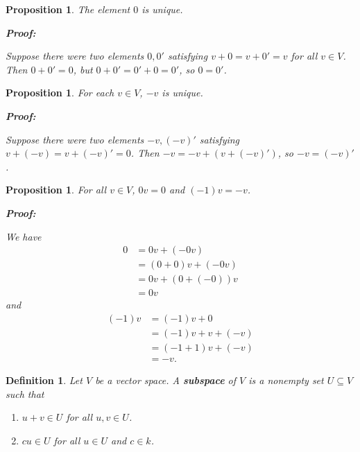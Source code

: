 \documentclass{article}
\theoremstyle{colontheorem}
\newtheorem{proposition}[theorem]{Proposition}
\newtheorem{definition}[theorem]{Definition}
\newenvironment{Proposition}
{
	\begin{mdframed}[backgroundcolor=TheoremOrange!10]
	\begin{proposition}
}
{
	\end{proposition}
	\end{mdframed}
	
	\vspace{.15in}
}
\newenvironment{Def}
{
	\begin{mdframed}[backgroundcolor=DefGreen!10]
	\begin{definition}
}
{
	\end{definition}
	\end{mdframed}
	
	\vspace{.15in}
}
\newenvironment{Proof}
{
	\begin{mdframed}[backgroundcolor=ProofPurple!10]
	\textbf{Proof:}%
}
{
	\end{mdframed}
	
	\vspace{.085in}
}
\begin{document}
\begin{Proposition}
	
	The element $0$ is unique.
	
	\begin{Proof}
		Suppose there were two elements $0, 0'$ satisfying $v + 0 = v + 0' = v$ for all $v \in V$. Then $0 + 0' = 0$, but $0 + 0' = 0' + 0 = 0'$, so $0 = 0'$. 
		
	\end{Proof}
	
\end{Proposition}



\begin{Proposition}
	
	For each $v \in V$, $-v$ is unique.
	
	\begin{Proof}
		Suppose there were two elements $-v, (-v)'$ satisfying $v + (-v) = v + (-v)' = 0$. Then $-v = -v + (v+(-v)')$, so $-v = (-v)'$.
		
	\end{Proof}
	
\end{Proposition}



\begin{Proposition}
	
	For all $v \in V$, $0v = 0$ and $(-1)v = -v$.
	
	\begin{Proof}
		We have 
		\begin{align*}
		0 &= 0v + (-0v)\\
		&= (0 + 0)v + (-0v)\\
		&= 0v + (0 + (-0))v\\
		&= 0v
		\end{align*} and \begin{align*}
		(-1)v &= (-1)v + 0\\
		&= (-1)v + v + (-v)\\
		&= (-1 + 1)v + (-v)\\
		&= -v.
		\end{align*}
		
	\end{Proof}
	
\end{Proposition}



\begin{Def}
	
	Let $V$ be a vector space. A \textbf{subspace} of $V$ is a nonempty set $U \subseteq V$ such that
	
	\begin{enumerate}
		
		\item $u+v \in U$ for all $u,v \in U$.
		\item $cu \in U$ for all $u \in U$ and $c \in k$.
		
	\end{enumerate}
	
\end{Def}
\end{document}
